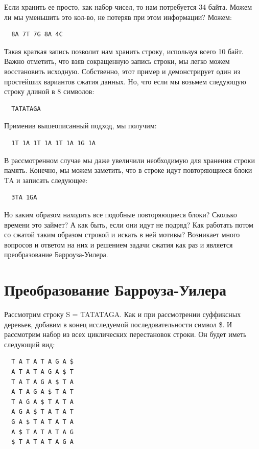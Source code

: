 \documentclass[letterpaper, 11pt]{article}
\begin{document}
Если хранить ее просто, как набор чисел, то нам потребуется 34 байта. Можем ли мы уменьшить это кол-во, не потеряв при этом информации? Можем:

\begin{verbatim}
  8A 7T 7G 8A 4C
\end{verbatim}

Такая краткая запись позволит нам хранить строку, используя всего 10 байт. Важно отметить, что взяв сокращенную запись строки, мы легко можем восстановить исходную. Собственно, этот пример и демонстрирует один из простейших вариантов сжатия данных. Но, что если мы возьмем следующую строку длиной в 8 символов:

\begin{verbatim}
  TATATAGA
\end{verbatim}

Применив вышеописанный подход, мы получим:

\begin{verbatim}
  1T 1A 1T 1A 1T 1A 1G 1A
\end{verbatim}

В рассмотренном случае мы даже увеличили необходимую для хранения строки память. Конечно, мы можем заметить, что в строке идут повторяющиеся блоки TA и записать следующее:

\begin{verbatim}
  3TA 1GA
\end{verbatim}

Но каким образом находить все подобные повторяющиеся блоки? Сколько времени это займет? А как быть, если они идут не подряд? Как работать потом со сжатой таким образом строкой и искать в ней мотивы? Возникает много вопросов и ответом на них и решением задачи сжатия как раз и является преобразование Барроуза-Уилера.

\section{Преобразование Барроуза-Уилера}

Рассмотрим строку S = TATATAGA. Как и при рассмотрении суффиксных деревьев, добавим в конец исследуемой последовательности символ \$. И рассмотрим набор из всех циклических перестановок строки. Он будет иметь следующий вид:
\begin{verbatim}
  T A T A T A G A $
  A T A T A G A $ T
  T A T A G A $ T A
  A T A G A $ T A T
  T A G A $ T A T A
  A G A $ T A T A T
  G A $ T A T A T A
  A $ T A T A T A G
  $ T A T A T A G A
\end{verbatim}
\end{document}
